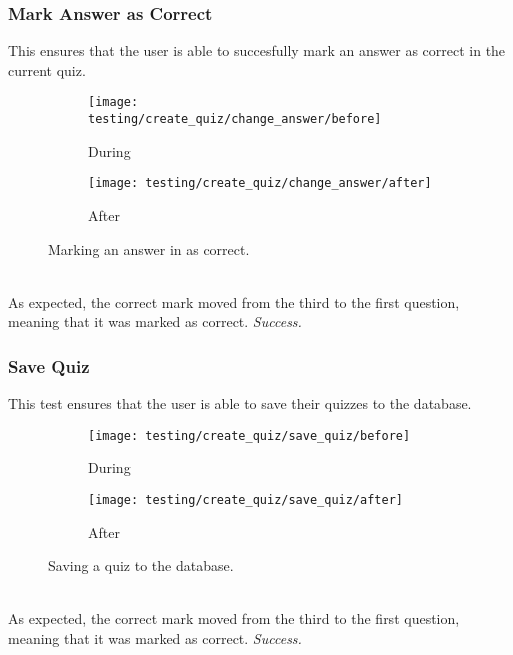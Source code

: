 \subsubsection{Mark Answer as Correct} %
\label{ssub:add_category}
This ensures that the user is able to succesfully mark an answer as correct in the current quiz.
\begin{figure}[!htbp]
\centering
\begin{subfigure}{0.5\textwidth}
  \centering
  \texttt{[image: testing/create\_quiz/change\_answer/before]}
  \caption{During}
  \label{fig:sub1}
\end{subfigure}%
\begin{subfigure}{0.5\textwidth}
  \centering
  \texttt{[image: testing/create\_quiz/change\_answer/after]}
  \caption{After}
  \label{fig:sub2}
\end{subfigure}
\caption{Marking an answer in as correct.}
\label{fig:test}
\end{figure}
\\As expected, the correct mark moved from the third to the first question, meaning that it was marked as correct. \textit{Success.}


\subsubsection{Save Quiz} %
\label{ssub:add_category}
This test ensures that the user is able to save their quizzes to the database.
\begin{figure}[!htbp]
\centering
\begin{subfigure}{0.5\textwidth}
  \centering
  \texttt{[image: testing/create\_quiz/save\_quiz/before]}
  \caption{During}
  \label{fig:sub1}
\end{subfigure}%
\begin{subfigure}{0.5\textwidth}
  \centering
  \texttt{[image: testing/create\_quiz/save\_quiz/after]}
  \caption{After}
  \label{fig:sub2}
\end{subfigure}
\caption{Saving a quiz to the database.}
\label{fig:test}
\end{figure}
\\As expected, the correct mark moved from the third to the first question, meaning that it was marked as correct. \textit{Success.}
